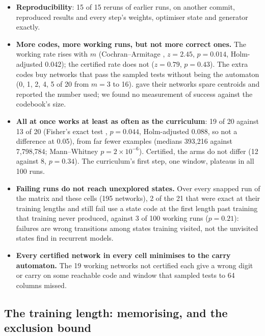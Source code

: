 \documentclass[11pt]{article}
\begin{document}
\begin{itemize}
\item \textbf{Reproducibility}: 15 of 15 reruns of earlier runs, on another commit, reproduced
  results and every step's weights, optimiser state and generator exactly.
\item \textbf{More codes, more working runs, but not more correct ones.} The working rate rises
  with $m$ (Cochran--Armitage \citep{cochran-1954-chi-square,armitage-1955-trend}, $z = 2.45$,
  $p = 0.014$, Holm-adjusted 0.042); the certified rate does not ($z = 0.79$, $p = 0.43$). The extra codes buy networks
  that pass the sampled tests without being the automaton (0, 1, 2, 4, 5 of 20 from $m = 3$ to 16).
  \citet{wang-2019-state-regularized-rnns} gave their networks spare centroids and reported the
  number used; we found no measurement of success against the codebook's size.
\item \textbf{All at once works at least as often as the curriculum}: 19 of 20 against 13 of 20
  (Fisher's exact test \citep{fisher-1922-contingency}, $p = 0.044$, Holm-adjusted 0.088, so not a
  difference at 0.05), from far fewer examples (medians 393{,}216
  against 7{,}798{,}784; Mann--Whitney \citep{mann-whitney-1947} $p = 2\times10^{-6}$). Certified,
  the arms do not differ (12 against 8, $p = 0.34$). The curriculum's first step, one window, plateaus
  in all 100 runs.
\item \textbf{Failing runs do not reach unexplored states.} Over every snapped run of the matrix and
  these cells (195 networks), 2 of the 21 that were exact at their training lengths and still fail
  use a state code at the first length past training that training never produced, against 3 of
  100 working runs ($p = 0.21$): failures are wrong transitions among states training visited, not
  the unvisited states \citet{buitrago-2025-length-generalization-recurrent-models} find in
  recurrent models.
\item \textbf{Every certified network in every cell minimises to the carry automaton.} The 19
  working networks not certified each give a wrong digit or carry on some reachable code and
  window that sampled tests to 64 columns missed.
\end{itemize}

\subsection{The training length: memorising, and the exclusion bound}
\label{sec:modsum}
\end{document}
